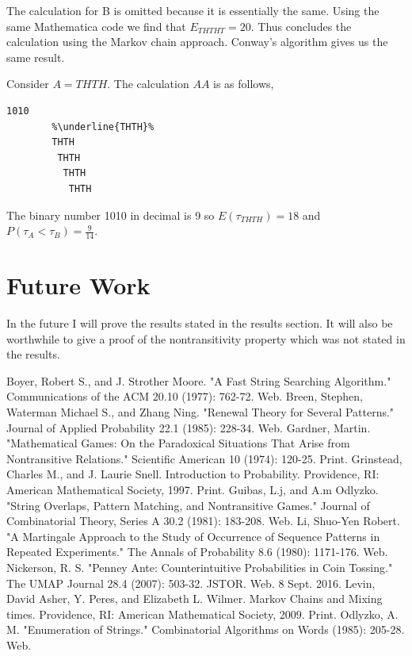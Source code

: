 \documentclass{article}
\numberwithin{mytheorem}{subsection} %
\begin{document}
		The calculation for B is omitted because it is essentially the same. Using the same Mathematica code we find that $E_{THTHT} = 20$. Thus concludes the calculation using the Markov chain approach. Conway's algorithm gives us the same result. 

		Consider $A = THTH$. The calculation $AA$ is as follows,   
		\begin{lstlisting}[escapechar=\%]
		1010 
		%\underline{THTH}%
		THTH
		 THTH
		  THTH 
		   THTH 
		\end{lstlisting}

		The binary number 1010 in decimal is 9 so $E(\tau_{THTH}) = 18$ and $P(\tau_A < \tau_B) = \frac{9}{14}$.

	\section{Future Work}
		In the future I will prove the results stated in the results section. It will also be worthwhile to give a proof of the nontransitivity property which was not stated in the results.

	\begin{thebibliography}{1}
			Boyer, Robert S., and J. Strother Moore. "A Fast String Searching Algorithm." Communications of the ACM 20.10 (1977): 762-72. Web. 
			Breen, Stephen, Waterman Michael S., and Zhang Ning. "Renewal Theory for Several Patterns." Journal of Applied Probability 22.1 (1985): 228-34. Web.
			Gardner, Martin. "Mathematical Games: On the Paradoxical Situations That Arise from Nontransitive Relations." Scientific American 10 (1974): 120-25. Print.
 			Grinstead, Charles M., and J. Laurie Snell. Introduction to Probability. Providence, RI: American Mathematical Society, 1997. Print. 
			Guibas, L.j, and A.m Odlyzko. "String Overlaps, Pattern Matching, and Nontransitive Games." Journal of Combinatorial Theory, Series A 30.2 (1981): 183-208. Web.
			Li, Shuo-Yen Robert. "A Martingale Approach to the Study of Occurrence of Sequence Patterns in Repeated Experiments." The Annals of Probability 8.6 (1980): 1171-176. Web.
			Nickerson, R. S. "Penney Ante: Counterintuitive Probabilities in Coin Tossing." The UMAP Journal 28.4 (2007): 503-32. JSTOR. Web. 8 Sept. 2016. 
			Levin, David Asher, Y. Peres, and Elizabeth L. Wilmer. Markov Chains and Mixing times. Providence, RI: American Mathematical Society, 2009. Print. 
			Odlyzko, A. M. "Enumeration of Strings." Combinatorial Algorithms on Words (1985): 205-28. Web.
			
	\end{thebibliography}
\end{document}
